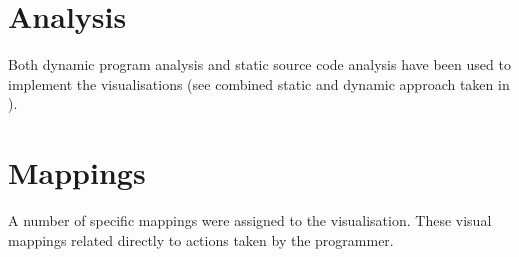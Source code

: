 \section{Analysis}

Both dynamic program analysis and static source code analysis have been used to implement the visualisations (see combined static and dynamic approach taken in \cite{Eisenbarth2003}).

\section{Mappings}

A number of specific mappings were assigned to the visualisation. These visual mappings related directly to actions taken by the programmer. 



